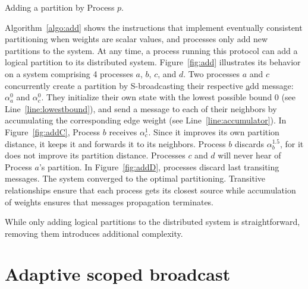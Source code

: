 \begin{algorithm}
  
  \caption{\label{algo:add}Adding a partition by Process $p$.}
\end{algorithm}

Algorithm~\ref{algo:add} shows the instructions that implement
eventually consistent partitioning when weights are scalar values, and
processes only add new partitions to the system.  At any time, a
process running this protocol can add a logical partition to its
distributed system.  Figure~\ref{fig:add} illustrates its behavior on
a system comprising 4 processes $a$, $b$, $c$, and $d$. Two processes
$a$ and $c$ concurrently create a partition by S-broadcasting their
respective \underline{a}dd message: $\alpha_a^0$ and
$\alpha_c^0$. They initialize their own state with the lowest possible
bound $0$ (see Line~\ref{line:lowestbound}), and send a message to
each of their neighbors by accumulating the corresponding edge weight
(see Line~\ref{line:accumulator}). In Figure~\ref{fig:addC}, Process
$b$ receives $\alpha_{c}^{1}$. Since it improves its own partition
distance, it keeps it and forwards it to its neighbors. Process $b$
discards $\alpha_{b}^{1.5}$, for it does not improve its partition
distance. Processes $c$ and $d$ will never hear of Process $a$'s
partition.  In Figure~\ref{fig:addD}, processes discard last
transiting messages. The system converged to the optimal partitioning.
Transitive relationships ensure that each process gets its closest
source while accumulation of weights ensures that messages propagation
terminates.


While only adding logical partitions to the distributed system is
straightforward, removing them introduces additional complexity. 





\section{Adaptive scoped broadcast}
\label{sec:adaptive}

